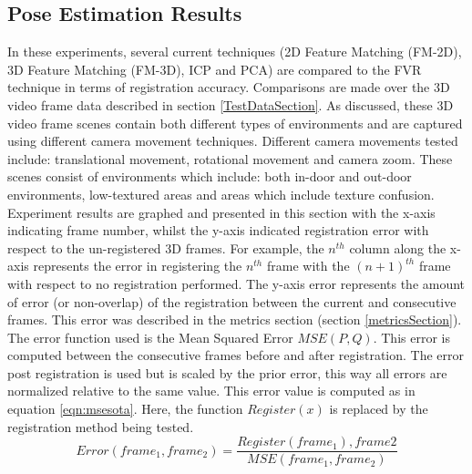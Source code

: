 \subsection{Pose Estimation Results}

In these experiments, several current techniques (2D Feature Matching (FM-2D), 3D Feature Matching (FM-3D), ICP and PCA) are compared to the FVR technique in terms of registration accuracy. Comparisons are made over the 3D video frame data described in section \ref{TestDataSection}. As discussed, these 3D video frame scenes contain both different types of environments and are captured using different camera movement techniques. Different camera movements tested include: translational movement, rotational movement and camera zoom. These scenes consist of environments which include: both in-door and out-door environments, low-textured areas and areas which include texture confusion. \\

Experiment results are graphed and presented in this section with the x-axis indicating frame number, whilst the y-axis indicated registration error with respect to the un-registered 3D frames. For example, the $n^{th}$ column along the x-axis represents the error in registering the $n^{th}$ frame with the $(n+1)^{th}$ frame with respect to no registration performed. The y-axis error represents the amount of error (or non-overlap) of the registration between the current and consecutive frames. This error was described in the metrics section (section \ref{metricsSection}). The error function used is the Mean Squared Error $MSE(P,Q)$. This error is computed between the consecutive frames before and after registration. The error post registration is used but is scaled by the prior error, this way all errors are normalized relative to the same value. This error value is computed as in equation \ref{eqn:msesota}. Here, the function $Register(x)$ is replaced by the registration method being tested. \\

\begin{equation} \label{eqn:msesota}
Error(frame_1, frame_2) =  \frac{Register(frame_1), frame2}{MSE(frame_1,frame_2)}
\end{equation}


